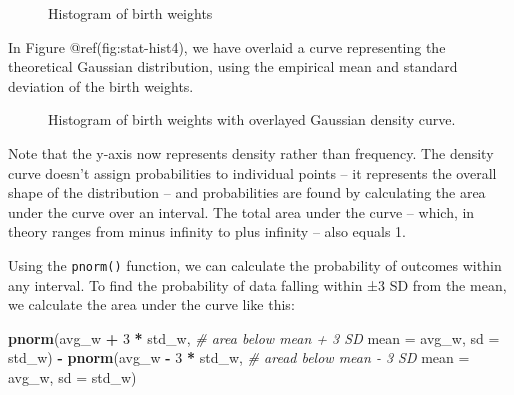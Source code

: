 \documentclass[
]{book}
\makeatletter
\newenvironment{Shaded}{\begin{snugshade}}{\end{snugshade}}
\newcommand{\AttributeTok}[1]{\textcolor[rgb]{0.13,0.29,0.53}{#1}}
\newcommand{\CommentTok}[1]{\textcolor[rgb]{0.56,0.35,0.01}{\textit{#1}}}
\newcommand{\ConstantTok}[1]{\textcolor[rgb]{0.56,0.35,0.01}{#1}}
\newcommand{\DecValTok}[1]{\textcolor[rgb]{0.00,0.00,0.81}{#1}}
\newcommand{\FunctionTok}[1]{\textcolor[rgb]{0.13,0.29,0.53}{\textbf{#1}}}
\newcommand{\NormalTok}[1]{#1}
\newcommand{\OtherTok}[1]{\textcolor[rgb]{0.56,0.35,0.01}{#1}}
\newcommand{\SpecialCharTok}[1]{\textcolor[rgb]{0.81,0.36,0.00}{\textbf{#1}}}
\newcommand*\pandocbounded[1]{%
  \sbox\pandoc@box{#1}%
  \Gscale@div\@tempa{\textheight}{\dimexpr\ht\pandoc@box+\dp\pandoc@box\relax}%
  \Gscale@div\@tempb{\linewidth}{\wd\pandoc@box}%
  \ifdim\@tempb\p@<\@tempa\p@\let\@tempa\@tempb\fi%
  \ifdim\@tempa\p@<\p@\scalebox{\@tempa}{\usebox\pandoc@box}%
  \else\usebox{\pandoc@box}%
  \fi%
}
\makeatother
\begin{document}
\begin{figure}
\centering
\pandocbounded{}
\caption{Histogram of birth weights}
\end{figure}

In Figure @ref(fig:stat-hist4), we have overlaid a curve representing
the theoretical Gaussian distribution, using the empirical mean and
standard deviation of the birth weights.

\begin{Shaded}
\end{Shaded}

\begin{figure}
\centering
\pandocbounded{}
\caption{Histogram of birth weights with overlayed Gaussian density
curve.}
\end{figure}

Note that the y-axis now represents density rather than frequency. The
density curve doesn't assign probabilities to individual points -- it
represents the overall shape of the distribution -- and probabilities
are found by calculating the area under the curve over an interval. The
total area under the curve -- which, in theory ranges from minus
infinity to plus infinity -- also equals 1.

Using the \texttt{pnorm()} function, we can calculate the probability of
outcomes within any interval. To find the probability of data falling
within ±3 SD from the mean, we calculate the area under the curve like
this:

\begin{Shaded}
\begin{Highlighting}[]
\FunctionTok{pnorm}\NormalTok{(avg\_w }\SpecialCharTok{+} \DecValTok{3} \SpecialCharTok{*}\NormalTok{ std\_w,    }\CommentTok{\# area below mean + 3 SD}
      \AttributeTok{mean =}\NormalTok{ avg\_w,}
      \AttributeTok{sd   =}\NormalTok{ std\_w) }\SpecialCharTok{{-}} 
  \FunctionTok{pnorm}\NormalTok{(avg\_w }\SpecialCharTok{{-}} \DecValTok{3} \SpecialCharTok{*}\NormalTok{ std\_w,  }\CommentTok{\# aread below mean {-} 3 SD}
        \AttributeTok{mean =}\NormalTok{ avg\_w, }
        \AttributeTok{sd   =}\NormalTok{ std\_w)}
\end{Highlighting}
\end{Shaded}
\end{document}
